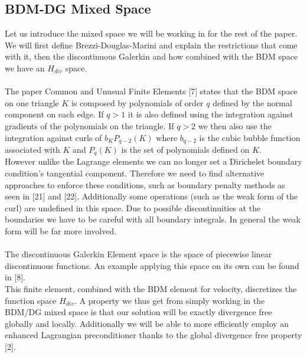 \documentclass[11pt,twoside,a4paper]{article}
\begin{document}
\subsection{BDM-DG Mixed Space}
Let us introduce the mixed space we will be working in for the rest of the paper. We will first define Brezzi-Douglas-Marini and explain the restrictions that come with it, then the discontinuous Galerkin and how combined with the BDM space we have an $H_{div}$ space.\\
\\
The paper Common and Unusual Finite Elements [7] states that the BDM space on one triangle $K$ is composed by polynomials of order $q$ defined by the normal component on each edge. If $q > 1$ it is also defined using the integration against gradients of the polynomials on the triangle. If $q > 2$ we then also use the integration  against curls of $b_K P_{q-2}(K)$ where $b_{q-2}$ is the cubic bubble function associated with $K$ and $P_{q}(K)$ is the set of polynomials defined on $K$.\\

However unlike the Lagrange elements we can no longer set a Dirichelet boundary condition's tangential component. Therefore we need to find alternative approaches to enforce these conditions, such as boundary penalty methods as seen in [21] and [22].
Additionally some operations (such as the weak form of the curl) are undefined in this space. Due to possible discontinuities at the boundaries we have to be careful with all boundary integrals.
In general the weak form will be far more involved.\\
\\

The discontinuous Galerkin Element space is the space of piecewise linear discontinuous functions. An example applying this space on its own can be found in [8].\\
This finite element, combined with the BDM element for velocity, discretizes the function space $H_{div}$. A property we thus get from simply working in the BDM/DG mixed space is that our solution will be exactly divergence free globally and locally.
Additionally we will be able to more efficiently employ an enhanced Lagrangian preconditioner thanks to the global divergence free property [2].\\
\end{document}
